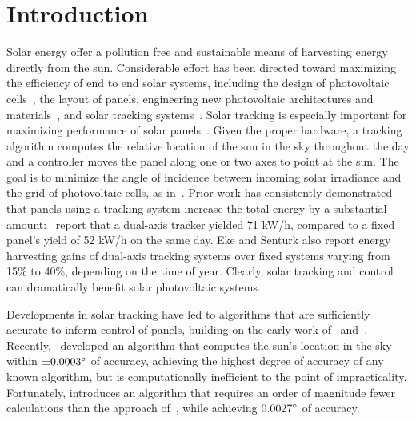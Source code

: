 \documentclass[11pt]{article}
\begin{document}
\section{Introduction}
Solar energy offer a pollution free and sustainable means of harvesting energy directly from the sun. Considerable effort has been directed toward maximizing the efficiency of end to end solar systems, including the design of photovoltaic cells~\cite{Jervase2001,li2012molecular}, the layout of panels, engineering new photovoltaic architectures and materials~\cite{li2005high}, and solar tracking systems~\cite{camacho2012control,hua2004modified}. Solar tracking is especially important for maximizing performance of solar panels~\cite{Eke2012,Rizk2008,King2001}. Given the proper hardware, a tracking algorithm computes the relative location of the sun in the sky throughout the day and a controller moves the panel along one or two axes to point at the sun. The goal is to minimize the angle of incidence between incoming solar irradiance and the grid of photovoltaic cells, as in~\citet{Eke2012,Benghanem2011,King2001, kalogirou1996design}. Prior work has consistently demonstrated that panels using a tracking system increase the total energy by a substantial amount:~\citet{Eke2012} report that a dual-axis tracker yielded 71 kW/h, compared to a fixed panel's yield of 52 kW/h on the same day. Eke and Senturk also report energy harvesting gains of dual-axis tracking systems over fixed systems varying from 15\% to 40\%, depending on the time of year. Clearly, solar tracking and control can dramatically benefit solar photovoltaic systems.

Developments in solar tracking have led to algorithms that are sufficiently accurate to inform control of panels, building on the early work of~\citet{spencer1971fourier,walraven1978calculating} and~\citet{michalsky1988astronomical}. Recently,~\citet{reda2004solar} developed an algorithm that computes the sun's location in the sky within $\pm 0.0003\degree$ of accuracy, achieving the highest degree of accuracy of any known algorithm, but is computationally inefficient to the point of impracticality. Fortunately, \citet{Grena2008} introduces an algorithm that requires an order of magnitude fewer calculations than the approach of~\citet{reda2004solar}, while achieving $0.0027\degree$ of accuracy.
\end{document}
